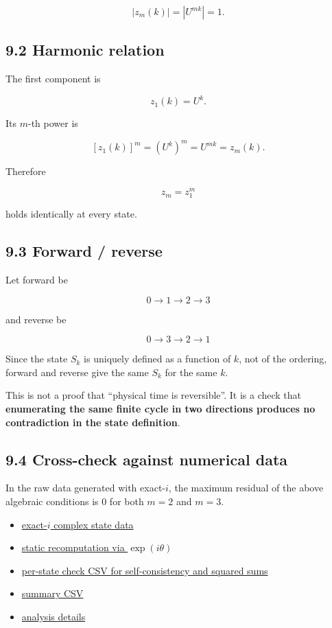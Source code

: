 \documentclass[
  a4paper,
]{article}
\providecommand{\tightlist}{%
  \setlength{\itemsep}{0pt}\setlength{\parskip}{0pt}}
\begin{document}
\[
|z_m(k)|
=
|U^{mk}|
=
1.
\]

\subsection{9.2 Harmonic relation}\label{harmonic-relation}

The first component is

\[
z_1(k)=U^k.
\]

Its \(m\)-th power is

\[
[z_1(k)]^m
=
(U^k)^m
=
U^{mk}
=
z_m(k).
\]

Therefore

\[
\boxed{z_m=z_1^m}
\]

holds identically at every state.

\subsection{9.3 Forward / reverse}\label{forward-reverse}

Let forward be

\[
0\to1\to2\to3
\]

and reverse be

\[
0\to3\to2\to1
\]

Since the state \(S_k\) is uniquely defined as a function of \(k\), not
of the ordering, forward and reverse give the same \(S_k\) for the same
\(k\).

This is not a proof that ``physical time is reversible''. It is a check
that \textbf{enumerating the same finite cycle in two directions
produces no contradiction in the state definition}.

\subsection{9.4 Cross-check against numerical
data}\label{cross-check-against-numerical-data}

In the raw data generated with exact-\(i\), the maximum residual of the
above algebraic conditions is 0 for both \(m=2\) and \(m=3\).

\begin{itemize}
\tightlist
\item
  \href{reproducibility_raw_readout_20260915/raw_data/complex_states_animation_exact_i.csv}{exact-\(i\)
  complex state data}
\item
  \href{reproducibility_raw_readout_20260915/raw_data/complex_states_static_exp.csv}{static
  recomputation via \(\exp(i\theta)\)}
\item
  \href{reproducibility_raw_readout_20260915/self_consistency_square_sum_U4_20260915/K4_self_consistency_square_sum_by_state_20260915.csv}{per-state
  check CSV for self-consistency and squared sums}
\item
  \href{reproducibility_raw_readout_20260915/self_consistency_square_sum_U4_20260915/K4_self_consistency_square_sum_summary_20260915.csv}{summary
  CSV}
\item
  \href{reproducibility_raw_readout_20260915/self_consistency_square_sum_U4_20260915/K4_self_consistency_square_sum_analysis_20260915.md}{analysis
  details}
\end{itemize}
\end{document}
